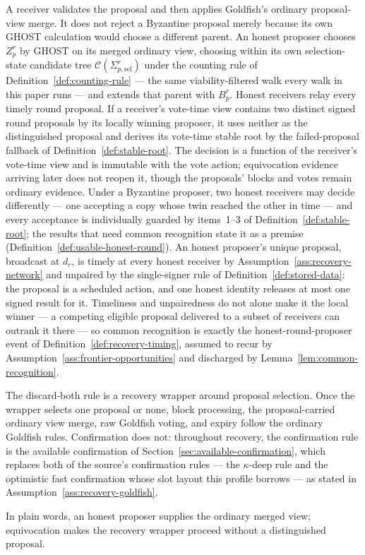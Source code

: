 \begin{definition}
A receiver validates the proposal and then applies Goldfish's ordinary
proposal-view merge.  It does not reject a Byzantine proposal merely because
its own GHOST calculation would choose a different parent.  An honest
proposer chooses \(Z_p^r\) by GHOST on its merged ordinary view,
choosing within its own selection-state candidate tree
\(\mathcal C(\Sigma_{p,\mathrm{sel}}^r)\) under the counting rule of
Definition~\ref{def:counting-rule} --- the same viability-filtered
walk every walk in this paper runs --- and extends
that parent with \(B_p^r\).  Honest receivers relay every timely round
proposal.  If a receiver's vote-time view contains two distinct signed
round proposals by its locally winning proposer, it uses neither as the
distinguished proposal and derives its vote-time stable root by the
failed-proposal fallback of Definition~\ref{def:stable-root}.  The
decision is a function of the receiver's vote-time view and is immutable
with the vote action; equivocation evidence arriving later does not
reopen it, though the proposals' blocks and votes remain ordinary
evidence.  Under a Byzantine proposer, two honest receivers may decide
differently --- one accepting a copy whose twin reached the other in
time --- and every acceptance is individually guarded by
items~1--3 of Definition~\ref{def:stable-root}; the results that need
common recognition state it as a premise
(Definition~\ref{def:usable-honest-round}).  An honest proposer's
unique proposal, broadcast at \(d_r\), is timely at every honest
receiver by Assumption~\ref{ass:recovery-network} and unpaired by the
single-signer rule of Definition~\ref{def:stored-data}: the proposal is
a scheduled action, and one honest identity releases at most one signed
result for it.  Timeliness and unpairedness do not alone make it the
local winner --- a competing eligible proposal delivered to a subset of
receivers can outrank it there --- so common recognition is exactly the
honest-round-proposer event of Definition~\ref{def:recovery-timing},
assumed to recur by Assumption~\ref{ass:frontier-opportunities} and
discharged by Lemma~\ref{lem:common-recognition}.

The discard-both rule is a recovery wrapper around proposal selection.  Once
the wrapper selects one proposal or none, block processing, the
proposal-carried ordinary view merge, raw Goldfish voting, and expiry
follow the ordinary Goldfish rules.  Confirmation does not: throughout
recovery, the confirmation rule is the available confirmation of
Section~\ref{sec:available-confirmation}, which replaces both of the
source's confirmation rules --- the \(\kappa\)-deep rule and the
optimistic fast confirmation whose slot layout this profile borrows ---
as stated in
Assumption~\ref{ass:recovery-goldfish}.

In plain words, an honest proposer supplies the ordinary merged view;
equivocation makes the recovery wrapper proceed without a distinguished
proposal.
\end{definition}


